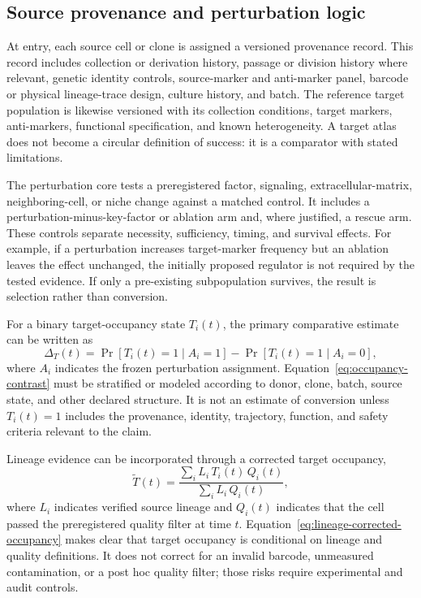 \documentclass[10pt,conference]{IEEEtran}
\begin{document}
\subsection{Source provenance and perturbation logic}

At entry, each source cell or clone is assigned a versioned provenance record. This record includes collection or derivation history, passage or division history where relevant, genetic identity controls, source-marker and anti-marker panel, barcode or physical lineage-trace design, culture history, and batch. The reference target population is likewise versioned with its collection conditions, target markers, anti-markers, functional specification, and known heterogeneity. A target atlas does not become a circular definition of success: it is a comparator with stated limitations.

The perturbation core tests a preregistered factor, signaling, extracellular-matrix, neighboring-cell, or niche change against a matched control. It includes a perturbation-minus-key-factor or ablation arm and, where justified, a rescue arm. These controls separate necessity, sufficiency, timing, and survival effects. For example, if a perturbation increases target-marker frequency but an ablation leaves the effect unchanged, the initially proposed regulator is not required by the tested evidence. If only a pre-existing subpopulation survives, the result is selection rather than conversion.

For a binary target-occupancy state $T_i(t)$, the primary comparative estimate can be written as
\begin{equation}
\Delta_T(t)=\Pr[T_i(t)=1\mid A_i=1]-\Pr[T_i(t)=1\mid A_i=0],
\label{eq:occupancy-contrast}
\end{equation}
where $A_i$ indicates the frozen perturbation assignment. Equation~\eqref{eq:occupancy-contrast} must be stratified or modeled according to donor, clone, batch, source state, and other declared structure. It is not an estimate of conversion unless $T_i(t)=1$ includes the provenance, identity, trajectory, function, and safety criteria relevant to the claim.

Lineage evidence can be incorporated through a corrected target occupancy,
\begin{equation}
\widetilde{T}(t)=\frac{\sum_i L_i\,T_i(t)\,Q_i(t)}{\sum_i L_i\,Q_i(t)},
\label{eq:lineage-corrected-occupancy}
\end{equation}
where $L_i$ indicates verified source lineage and $Q_i(t)$ indicates that the cell passed the preregistered quality filter at time $t$. Equation~\eqref{eq:lineage-corrected-occupancy} makes clear that target occupancy is conditional on lineage and quality definitions. It does not correct for an invalid barcode, unmeasured contamination, or a post hoc quality filter; those risks require experimental and audit controls.
\end{document}

